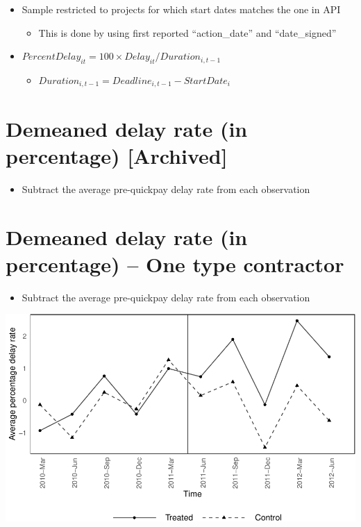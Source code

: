 \documentclass[
]{article}
\providecommand{\tightlist}{%
  \setlength{\itemsep}{0pt}\setlength{\parskip}{0pt}}
\begin{document}
\begin{itemize}
\tightlist
\item
  Sample restricted to projects for which start dates matches the one in
  API

  \begin{itemize}
  \tightlist
  \item
    This is done by using first reported ``action\_date'' and
    ``date\_signed''
  \end{itemize}
\item
  \(PercentDelay_{it}=100 \times Delay_{it}/Duration_{i,t-1}\)

  \begin{itemize}
  \tightlist
  \item
    \(Duration_{i,t-1} = Deadline_{i,t-1} - StartDate_i\)
  \end{itemize}
\end{itemize}

\hypertarget{demeaned-delay-rate-in-percentage-archived}{%
\section{Demeaned delay rate (in percentage)
{[}Archived{]}}\label{demeaned-delay-rate-in-percentage-archived}}

\begin{itemize}
\tightlist
\item
  Subtract the average pre-quickpay delay rate from each observation
\end{itemize}

\hypertarget{demeaned-delay-rate-in-percentage-one-type-contractor}{%
\section{Demeaned delay rate (in percentage) -- One type
contractor}\label{demeaned-delay-rate-in-percentage-one-type-contractor}}

\begin{itemize}
\tightlist
\item
  Subtract the average pre-quickpay delay rate from each observation
\end{itemize}

\includegraphics{qp_first_pc_delay-2_files/figure-latex/demeaned_plot_one_type-1.pdf}
\end{document}
